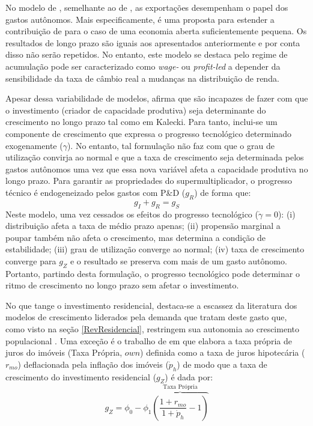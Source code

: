 No modelo de \textcite{nah_long-run_2017}, semelhante ao de \textcite{dejuan_hidden_2017}, as exportações desempenham o papel dos gastos autônomos. Mais especificamente, é uma proposta para estender a contribuição de \textcite{serrano_sraffian_1995} para o caso de uma economia aberta suficientemente pequena. Os resultados de longo prazo são iguais aos apresentados anteriormente e por conta disso não serão repetidos. No entanto, este modelo se destaca pelo regime de acumulação pode ser caracterizado como \textit{wage-} ou \textit{profit-led} a depender da sensibilidade da taxa de câmbio real a mudanças na distribuição de renda. 

Apesar dessa variabilidade de modelos, \textcite{dutt_observations_2018} afirma que são incapazes de fazer com que o investimento (criador de capacidade produtiva) seja determinante do crescimento no longo prazo tal como em Kalecki. Para tanto, inclui-se um componente de crescimento que expressa o progresso tecnológico determinado exogenamente ($\gamma$). No entanto, tal formulação não faz com que o grau de utilização convirja ao normal e que a taxa de crescimento seja determinada pelos gastos autônomos uma vez que essa nova variável afeta a capacidade produtiva no longo prazo. Para garantir as propriedades do supermultiplicador, o progresso técnico é endogeneizado pelos gastos com P\&D ($g_R$) de forma que:
$$
g_I + g_R = g_S
$$
Neste modelo, uma vez cessados os efeitos do progresso tecnológico ($\dot \gamma = 0$): 
	(i) distribuição afeta a taxa de médio prazo apenas; 
	(ii) propensão marginal a poupar também não afeta o crescimento, mas determina a condição de estabilidade; 
	(iii) grau de utilização converge ao normal; 
	(iv) taxa de crescimento converge para $g_Z$ e o resultado se preserva com mais de um gasto autônomo. Portanto, partindo desta formulação, o progresso tecnológico pode determinar o ritmo de crescimento no longo prazo sem afetar o investimento.

No que tange o investimento residencial, destaca-se a escassez da literatura dos modelos de crescimento liderados pela demanda que tratam deste gasto que, como visto na seção \ref{RevResidencial}, restringem sua autonomia ao crescimento populacional \cite{gowans_introducing_2014}. Uma exceção é o trabalho de \textcite{teixeira_crescimento_2015} em que elabora a taxa própria de juros do imóveis (Taxa Própria, $own$) definida como a taxa de juros hipotecária ($r_{mo}$) deflacionada pela inflação dos imóveis ({$\dot p_h$}) de modo que a taxa de crescimento do investimento residencial ($g_Z$) é dada por:
$$
g_Z = \phi_0 - \phi_1 \overbrace{\left(\frac{1+r_{mo}}{1+\dot p_h} - 1\right)}^{\text{Taxa Própria}}
$$

